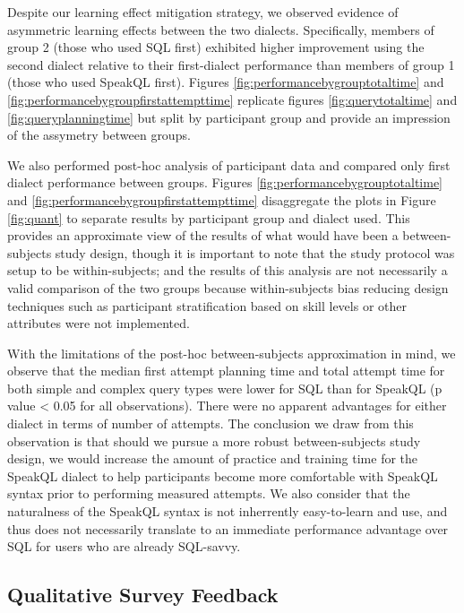 Despite our learning effect mitigation strategy, we observed evidence of asymmetric learning effects between the two dialects. 
Specifically, members of group 2 (those who used SQL first) exhibited higher improvement using the second dialect relative to their first-dialect performance than members of group 1 (those who used SpeakQL first). 
Figures \ref{fig:performancebygrouptotaltime} and \ref{fig:performancebygroupfirstattempttime} replicate figures \ref{fig:querytotaltime} and \ref{fig:queryplanningtime} but split by participant group and provide an impression of the assymetry between groups. 

We also performed post-hoc analysis of participant data and compared only first dialect performance between groups.
Figures \ref{fig:performancebygrouptotaltime} and \ref{fig:performancebygroupfirstattempttime} disaggregate the plots in Figure \ref{fig:quant} to separate results by participant group and dialect used.
This provides an approximate view of the results of what would have been a between-subjects study design, though it is important to note that the study protocol was setup to be within-subjects; and the results of this analysis are not necessarily a valid comparison of the two groups because within-subjects bias reducing design techniques such as participant stratification based on skill levels or other attributes were not implemented. 

With the limitations of the post-hoc between-subjects approximation in mind, we observe that the median first attempt planning time and total attempt time for both simple and complex query types were lower for SQL than for SpeakQL (p value < 0.05 for all observations). 
There were no apparent advantages for either dialect in terms of number of attempts. 
The conclusion we draw from this observation is that should we pursue a more robust between-subjects study design, we would increase the amount of practice and training time for the SpeakQL dialect to help participants become more comfortable with SpeakQL syntax prior to performing measured attempts.
We also consider that the naturalness of the SpeakQL syntax is not inherrently easy-to-learn and use, and thus does not necessarily translate to an immediate performance advantage over SQL for users who are already SQL-savvy. 




\subsection{Qualitative Survey Feedback}


